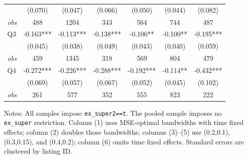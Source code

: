 \begin{table}[!htbp]
\begin{tabular}{lcccccc}
 & (0.070) & (0.047) & (0.066) & (0.050) & (0.044) & (0.082) \\
\textit{obs} & 488 & 1204 & 343 & 564 & 744 & 487 \\
Q3 & -0.163*** & -0.113*** & -0.138*** & -0.106** & -0.100** & -0.195*** \\
 & (0.045) & (0.038) & (0.049) & (0.043) & (0.040) & (0.059) \\
\textit{obs} & 459 & 1345 & 318 & 569 & 804 & 479 \\
Q4 & -0.272*** & -0.226*** & -0.288*** & -0.192*** & -0.114** & -0.432*** \\
 & (0.069) & (0.057) & (0.067) & (0.052) & (0.045) & (0.102) \\
\textit{obs} & 261 & 577 & 352 & 555 & 823 & 222 \\
\bottomrule
\end{tabular}
\begin{minipage}{0.98\textwidth}\footnotesize
Notes: All samples impose \texttt{ex\_super2==t}. The pooled sample imposes no \texttt{ex\_super} restriction. Column (1) uses MSE-optimal bandwidths with time fixed effects; column (2) doubles those bandwidths; columns (3)--(5) use (0.2,0.1), (0.3,0.15), and (0.4,0.2); column (6) omits time fixed effects. Standard errors are clustered by listing ID.
\end{minipage}
\end{table}

